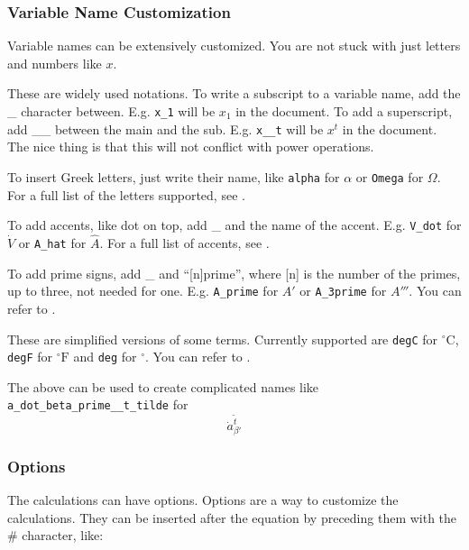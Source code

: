 \documentclass[12pt]{article}
\begin{document}
\subsubsection{Variable Name Customization}

Variable names can be extensively customized. You are not stuck with just
letters and numbers like $x$.

\begin{description}
    \setlength\itemsep{0pt}
    \item[Subscript, Superscript] These are widely used notations. To write a
        subscript to a variable name, add the \_ character between. E.g.
        \verb|x_1| will be $x_1$ in the document. To add a superscript, add
        \_\_ between the main and the sub. E.g. \verb|x__t| will be $x^t$ in
        the document. The nice thing is that this will not conflict with power
        operations.
    \item[Greek Letters] To insert Greek letters, just write their name, like
        \verb|alpha| for $\alpha$ or \verb|Omega| for $\Omega$. For a full list
        of the letters supported, see .
    \item[Accents] To add accents, like dot on top, add \_ and the name of the
        accent. E.g. \verb|V_dot| for $\dot{V}$ or \verb|A_hat| for $\hat{A}$.
        For a full list of accents, see .
    \item[Primes] To add prime signs, add \_ and ``[n]prime'', where [n] is the
        number of the primes, up to three, not needed for one. E.g.
        \verb|A_prime| for $A'$ or \verb|A_3prime| for $A'''$. You can refer to
        .
    \item[Special] These are simplified versions of some terms. Currently
        supported are \verb|degC| for $^\circ\mathrm{C}$, \verb|degF| for
        $^\circ\mathrm{F}$ and \verb|deg| for $^\circ$. You can refer to
        .
\end{description}

The above can be used to create complicated names like\\
\verb|a_dot_beta_prime__t_tilde| for
\[
    \displaystyle {\dot{a}}_{{\beta}'}^{\tilde{t}}
\]

\subsubsection{Options}
\label{options}

The calculations can have options. Options are a way to customize the
calculations.  They can be inserted after the equation by preceding them with
the \# character, like:
\end{document}
